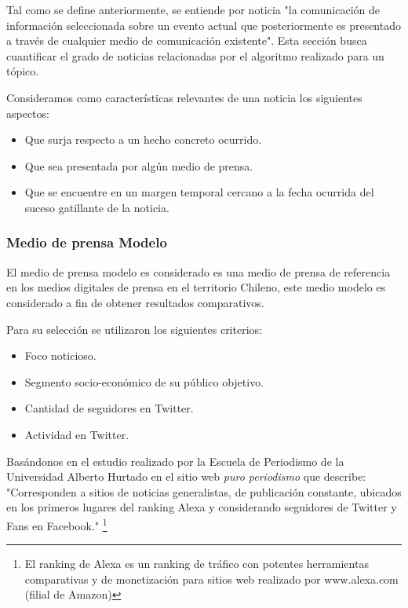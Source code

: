 Tal como se define anteriormente, se entiende por noticia "la comunicación de información seleccionada sobre un evento actual que posteriormente es presentado a través de cualquier medio de comunicación existente".\cite{Shirky_2008_Herecomes} Esta sección busca cuantificar el grado de noticias relacionadas por el algoritmo realizado para un tópico.

Consideramos como características relevantes de una noticia los siguientes aspectos:

\begin{itemize}
	\item Que surja respecto a un hecho concreto ocurrido.
	\item Que sea presentada por algún medio de prensa.
	\item Que se encuentre en un margen temporal cercano a la fecha ocurrida del suceso gatillante de la noticia.
\end{itemize}

\subsubsection{Medio de prensa Modelo}

El medio de prensa modelo es considerado es una medio de prensa de referencia en los medios digitales de prensa en el territorio Chileno, este medio modelo es considerado a fin de obtener resultados comparativos.

Para su selección se utilizaron los siguientes criterios:

\begin{itemize}
	\item Foco noticioso.
	\item Segmento socio-económico de su público objetivo.
	\item Cantidad de seguidores en Twitter.
	\item Actividad en Twitter.
\end{itemize}

Basándonos en el estudio \cite{puroperiodismoMenciones} realizado por la Escuela de Periodismo de la Universidad Alberto Hurtado en el sitio web \emph{puro periodismo} que describe: "Corresponden a sitios de noticias generalistas, de publicación constante, ubicados en los primeros lugares del ranking Alexa y considerando seguidores de Twitter y Fans en Facebook."  \footnote{El ranking de Alexa es un ranking de tráfico con potentes herramientas comparativas y de monetización para sitios web realizado por www.alexa.com (filial de Amazon)}

